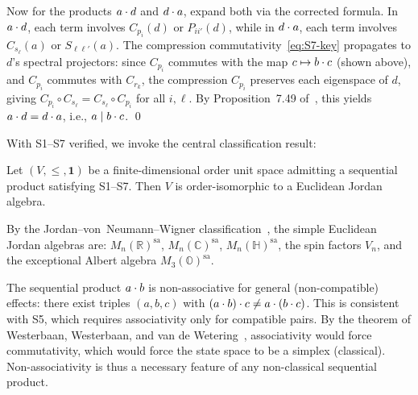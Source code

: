 Now for the products $\sp{a}{d}$ and $\sp{d}{a}$, expand both via the
corrected formula. In $\sp{a}{d}$, each term involves $C_{p_i}(d)$
or $P_{ii'}(d)$, while in $\sp{d}{a}$, each term involves $C_{s_\ell}(a)$
or $S_{\ell\ell'}(a)$. The compression commutativity~\eqref{eq:S7-key}
propagates to $d$'s spectral projectors: since $C_{p_i}$ commutes with
the map $c \mapsto \sp{b}{c}$ (shown above), and $C_{p_i}$ commutes with
$C_{r_k}$, the compression $C_{p_i}$ preserves each eigenspace of $d$,
giving $C_{p_i} \circ C_{s_\ell} = C_{s_\ell} \circ C_{p_i}$ for all
$i, \ell$. By Proposition~7.49
of~\cite{AlfsenShultz2003}, this yields $\sp{a}{d} = \sp{d}{a}$,
i.e., $a \compatible \sp{b}{c}$. \qed

\bigskip

With S1--S7 verified, we invoke the central classification result:

\begin{theorem}
\label{thm:EJA}
Let $(V, \le, \mathbf{1})$ be a finite-dimensional order unit space
admitting a sequential product satisfying S1--S7. Then $V$ is
order-isomorphic to a Euclidean Jordan algebra.
\end{theorem}

By the Jordan--von~Neumann--Wigner classification~\cite{JordanVonNeumannWigner1934}, the
simple Euclidean Jordan algebras are: $M_n(\mathbb{R})^{\mathrm{sa}}$,
$M_n(\mathbb{C})^{\mathrm{sa}}$, $M_n(\mathbb{H})^{\mathrm{sa}}$, the
spin factors $V_n$, and the exceptional Albert algebra
$M_3(\mathbb{O})^{\mathrm{sa}}$.

\begin{remark}
The sequential product $\sp{a}{b}$ is non-associative for general
(non-compatible) effects: there exist triples $(a,b,c)$ with
$\sp{(\sp{a}{b})}{c} \ne \sp{a}{(\sp{b}{c})}$. This is consistent with
S5, which requires associativity only for compatible pairs. By the theorem
of Westerbaan, Westerbaan, and van de
Wetering~\cite{WesterbaanWesterbaanVdW2020}, associativity would force
commutativity, which would force the state space to be a simplex
(classical). Non-associativity is thus a necessary feature of any
non-classical sequential product.
\end{remark}
